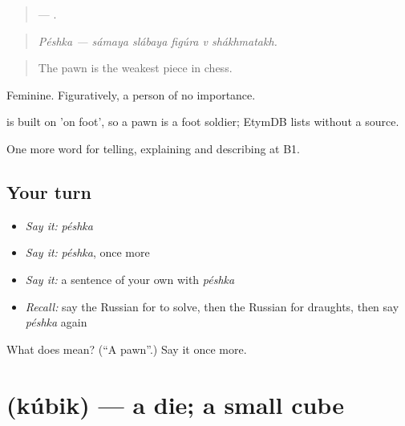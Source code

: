 \begin{quote}
 —     .
\end{quote}

\begin{quote}
\emph{Péshka — sámaya slábaya figúra v shákhmatakh.}
\end{quote}

\begin{quote}
The pawn is the weakest piece in chess.
\end{quote}

Feminine. Figuratively, a person of no importance.

\begin{cousinweb}
\emph{} is built on \emph{} 'on foot', so a pawn is a foot soldier; EtymDB lists \emph{} without a source.
\end{cousinweb}

\begin{grammarlens}[title={What you've built}]
One more word for telling, explaining and describing at B1.
\end{grammarlens}

\subsection*{Your turn}
\begin{itemize}
\raggedright
  \item \emph{Say it:} \emph{péshka}
  \item \emph{Say it:} \emph{péshka}, once more
  \item \emph{Say it:} a sentence of your own with \emph{péshka}
  \item \emph{Recall:} say the Russian for to solve, then the Russian for draughts, then say \emph{péshka} again
\end{itemize}

\begin{tcolorbox}[breakable,colback=teal!4,colframe=teal!35!black,title={Before you move on}]
What does  mean? (\textquotedblleft{}A pawn\textquotedblright{}.) Say it once more.
\end{tcolorbox}
\section[\texorpdfstring{\ru{кубик} (kúbik)}{кубик (kúbik)}]{ (kúbik) — a die; a small cube}

\label{lesson:RU-C504-kubik}



